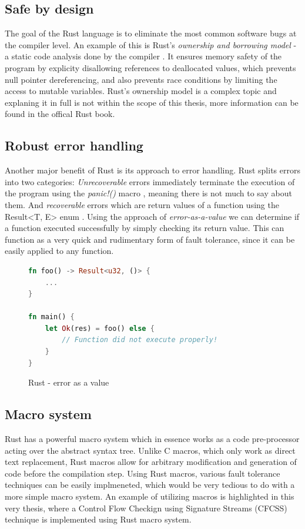 \documentclass[12pt, letterpaper]{article}
\begin{document}
\subsection{Safe by design}
The goal of the Rust language is to eliminate the most common software bugs at the compiler level. An example of this is Rust's \textit{ownership and borrowing model} - a static code analysis done by the compiler \cite{rust_book:ownership}. It ensures memory safety of the program by explicity disallowing references to deallocated values, which prevents null pointer dereferencing, and also prevents race conditions by limiting the access to mutable variables. Rust's ownership model is a complex topic and explaning it in full is not within the scope of this thesis, more information can be found in the offical Rust book.

\subsection{Robust error handling}
Another major benefit of Rust is its approach to error handling. Rust splits errors into two categories: \textit{Unrecoverable} errors immediately terminate the execution of the program using the \textit{panic!()} macro \cite{rust_book:panic}, meaning there is not much to say about them. And \textit{recoverable} errors which are return values of a function using the Result<T, E> enum \cite{rust_book:result}. Using the approach of \textit{error-as-a-value} we can determine if a function executed successfully by simply checking its return value. This can function as a very quick and rudimentary form of fault tolerance, since it can be easily applied to any function.
\newpage
\begin{figure}
\begin{lstlisting}[language=Rust]
fn foo() -> Result<u32, ()> {
    ...
}

fn main() {
    let Ok(res) = foo() else {
        // Function did not execute properly!
    }
}
\end{lstlisting}
\caption{Rust - error as a value}
\label{fig:rust_error}
\end{figure}


\subsection{Macro system}
Rust has a powerful macro system which in essence works as a code pre-processor acting over the abstract syntax tree. Unlike C macros, which only work as direct text replacement, Rust macros allow for arbitrary modification and generation of code before the compilation step. Using Rust macros, various fault tolerance techniques can be easily implmeneted, which would be very tedious to do with a more simple macro system. An example of utilizing macros is highlighted in this very thesis, where a Control Flow Checkign using Signature Streams (CFCSS) technique is implemented using Rust macro system. 
\end{document}
